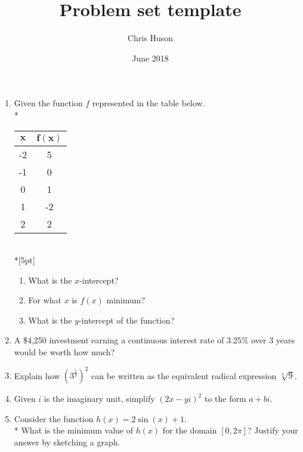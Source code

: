 \documentclass[12pt, oneside]{article}
\title{Problem set template}
\author{Chris Huson}
\date{June 2018}
\begin{document}
\begin{enumerate}
\item Given the function $f$ represented in the table below.\\*
\begin{center}
\begin{tabular}{|c|c|}
    \hline 
    $\boldsymbol{x}$ & $\boldsymbol{f(x)}$\\ 
    \hline 
    -2 & 5 \\ 
    \hline 
    -1 & 0 \\ 
    \hline 
    0 & 1 \\ 
    \hline 
    1 & -2 \\ 
    \hline 
    2 & 2 \\ 
    \hline 
\end{tabular}\\*[5pt]
\end{center}
\begin{enumerate}
    \item What is the $x$-intercept?\\[25pt]
    \item For what $x$ is $f(x)$ minimum?\\[25pt]
    \item What is the $y$-intercept of the function?\\[15pt]
\end{enumerate}

\newpage

\item A \$4,250 investment earning a continuous interest rate of 3.25\% over 3 years would be worth how much?\\[2in]


\item Explain how $\displaystyle \left(3^{\frac{1}{3}} \right)^2$ can be written as the equivalent radical expression $\sqrt[3]9$. \\[3in] %

\item Given $i$ is the imaginary unit, simplify $(2x-yi)^2$ to the form $a+bi$. \\[1.8in]%

\newpage

\item Consider the function $h(x) = 2\sin(x) + 1$.\\*
What is the minimum value of $h(x)$ for the domain $[0,2\pi]$? Justify your answer by sketching a graph. \\[2in]%



\end{enumerate}
\end{document}
